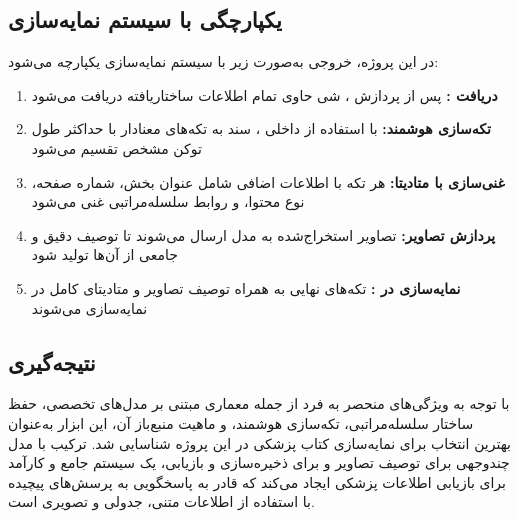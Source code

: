 \newpage

\subsection{یکپارچگی با سیستم نمایه‌سازی}
در این پروژه، خروجی  به‌صورت زیر با سیستم نمایه‌سازی یکپارچه می‌شود:

\begin{enumerate}
    \item \textbf{دریافت :} پس از پردازش ، شی  حاوی تمام اطلاعات ساختاریافته دریافت می‌شود
    
    \item \textbf{تکه‌سازی هوشمند:} با استفاده از  داخلی ، سند به تکه‌های معنادار با حداکثر طول توکن مشخص تقسیم می‌شود
    
    \item \textbf{غنی‌سازی با متادیتا:} هر تکه با اطلاعات اضافی شامل عنوان بخش، شماره صفحه، نوع محتوا، و روابط سلسله‌مراتبی غنی می‌شود
    
    \item \textbf{پردازش تصاویر:} تصاویر استخراج‌شده به مدل  ارسال می‌شوند تا توصیف دقیق و جامعی از آن‌ها تولید شود
    
    \item \textbf{نمایه‌سازی در :} تکه‌های نهایی به همراه توصیف تصاویر و متادیتای کامل در  نمایه‌سازی می‌شوند
\end{enumerate}

\subsection{نتیجه‌گیری}
با توجه به ویژگی‌های منحصر به فرد  از جمله معماری مبتنی بر مدل‌های تخصصی، حفظ ساختار سلسله‌مراتبی، تکه‌سازی هوشمند، و ماهیت منبع‌باز آن، این ابزار به‌عنوان بهترین انتخاب برای نمایه‌سازی کتاب پزشکی در این پروژه شناسایی شد. ترکیب  با مدل چندوجهی  برای توصیف تصاویر و  برای ذخیره‌سازی و بازیابی، یک سیستم جامع و کارآمد برای بازیابی اطلاعات پزشکی ایجاد می‌کند که قادر به پاسخگویی به پرسش‌های پیچیده با استفاده از اطلاعات متنی، جدولی و تصویری است.
